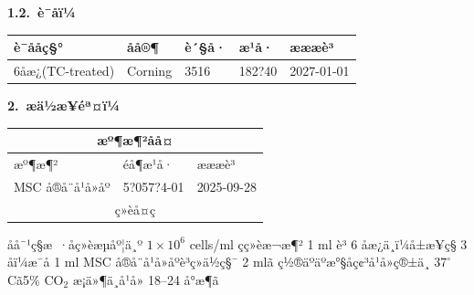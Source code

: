 \documentclass[UTF8,10pt,a4paper,fontset=fandol]{ctexart}
\newcommand{\fieldvalue}[1]{#1}
\newcommand{\handwritten}[1]{#1}
\begin{document}
\textbf{1.2.\ è¯åï¼}

\begin{tabularx}{\textwidth}{|X|X|X|X|X|}
\hline
è¯ååç§° & åå®¶ & è´§å· & æ¹å· & æææè³ \\ \hline
6å­æ¿(TC-treated) &
\fieldvalue{Corning} &
\fieldvalue{3516} &
\fieldvalue{\handwritten{182?40}} &
\fieldvalue{\handwritten{2027-01-01}} \\ \hline
\end{tabularx}

\textbf{2.\ æä½æ­¥éª¤ï¼}

\begin{tabularx}{\textwidth}{|X|X|X|}
\hline
\multicolumn{3}{|c|}{æº¶æ¶²åå¤} \\ \hline
æº¶æ¶² & éå¶æ¹å· & æææè³ \\ \hline
MSC å®å¨å¹å»åº &
\fieldvalue{\handwritten{5?057?4-01}} &
\fieldvalue{\handwritten{2025-09-28}} \\ \hline
\multicolumn{3}{|c|}{ç»èå¤ç} \\ \hline
\end{tabularx}

åå¯¹ç§æ ·åç»èæµåº¦ä¸º $1\times10^{6}$ cells/ml çç»èæ¬æ¶²
1 ml è³ 6 å­æ¿ä¸­ï¼å±æ¥ç§ 3 å­ï¼æ¯å­ 1 ml MSC å®å¨å¹å»åºè³ç»ä½ç§¯ 2 mlã
ç½®äºäºæ°§åç¢³å¹å»ç®±ä¸­ $37^\circ$Cã5\% CO$_2$ æ¡ä»¶ä¸å¹å» 18--24 å°æ¶ã
\end{document}
